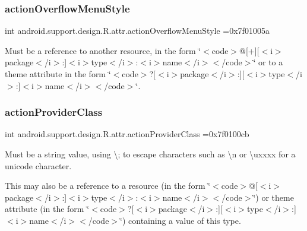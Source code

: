 \subsubsection{\texorpdfstring{action\+Overflow\+Menu\+Style}{actionOverflowMenuStyle}}
{\footnotesize\ttfamily int android.\+support.\+design.\+R.\+attr.\+action\+Overflow\+Menu\+Style =0x7f01005a\hspace{0.3cm}{\ttfamily [static]}}

Must be a reference to another resource, in the form \char`\"{}$<$code$>$@\mbox{[}+\mbox{]}\mbox{[}$<$i$>$package$<$/i$>$\+:\mbox{]}$<$i$>$type$<$/i$>$\+:$<$i$>$name$<$/i$>$$<$/code$>$\char`\"{} or to a theme attribute in the form \char`\"{}$<$code$>$?\mbox{[}$<$i$>$package$<$/i$>$\+:\mbox{]}\mbox{[}$<$i$>$type$<$/i$>$\+:\mbox{]}$<$i$>$name$<$/i$>$$<$/code$>$\char`\"{}. \mbox{\label{classandroid_1_1support_1_1design_1_1R_1_1attr_af8e913202203f0fa6bb2fd297472c507}} 
\subsubsection{\texorpdfstring{action\+Provider\+Class}{actionProviderClass}}
{\footnotesize\ttfamily int android.\+support.\+design.\+R.\+attr.\+action\+Provider\+Class =0x7f0100cb\hspace{0.3cm}{\ttfamily [static]}}

Must be a string value, using \textquotesingle{}\textbackslash{};\textquotesingle{} to escape characters such as \textquotesingle{}\textbackslash{}n\textquotesingle{} or \textquotesingle{}\textbackslash{}uxxxx\textquotesingle{} for a unicode character. 

This may also be a reference to a resource (in the form \char`\"{}$<$code$>$@\mbox{[}$<$i$>$package$<$/i$>$\+:\mbox{]}$<$i$>$type$<$/i$>$\+:$<$i$>$name$<$/i$>$$<$/code$>$\char`\"{}) or theme attribute (in the form \char`\"{}$<$code$>$?\mbox{[}$<$i$>$package$<$/i$>$\+:\mbox{]}\mbox{[}$<$i$>$type$<$/i$>$\+:\mbox{]}$<$i$>$name$<$/i$>$$<$/code$>$\char`\"{}) containing a value of this type. \mbox{\label{classandroid_1_1support_1_1design_1_1R_1_1attr_ac560c622d91c1f3125e880765842e01a}} 
